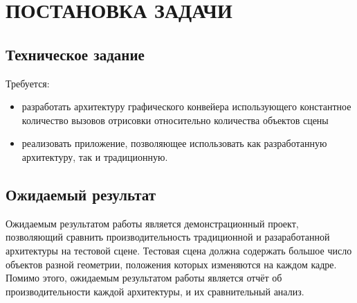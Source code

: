 \chapter{ПОСТАНОВКА ЗАДАЧИ} \label{ch1}

\section{Техническое задание} \label{ch1:sec1}
Требуется:
\begin{itemize}
	\item разработать архитектуру графического конвейера использующего константное количество вызовов отрисовки относительно количества объектов сцены 
	\item реализовать приложение, позволяющее использовать как разработанную архитектуру, так и традиционную.
\end{itemize}

\section{Ожидаемый результат} \label{ch1:sec2}
Ожидаемым результатом работы является демонстрационный проект, позволяющий сравнить производительность традиционной и разаработанной архитектуры на тестовой сцене. Тестовая сцена должна содержать большое число объектов разной геометрии, положения которых изменяются на каждом кадре. Помимо этого, ожидаемым результатом работы является отчёт об производительности каждой архитектуры, и их сравнительный анализ.






